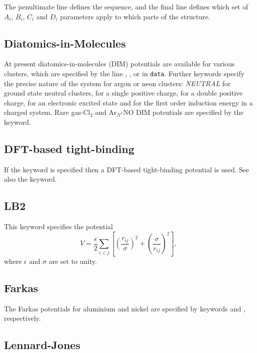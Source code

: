 {\noindent The penultimate line defines the sequence, and the final line
defines which set of $A_i$, $B_i$, $C_i$ and $D_i$ parameters apply to which 
parts of the structure.\cite{BrownFH03}


\subsection{Diatomics-in-Molecules}

At present diatomics-in-molecules (DIM) potentials are available for various
clusters, which are specified by the line {\/}, {\/},
{} or {\/} in {\tt data}.
Further keywords specify the precise nature of the system for argon or
neon clusters: {\it NEUTRAL\/} for ground state neutral
clusters, {\/} for a single positive charge, {\/} for a double positive
charge, {\/} for an electronic excited state and {\/} for the first order
induction energy in a charged system. Rare gas-Cl$_2$ and Ar$_N$-NO DIM potentials
are specified by the {\/} keyword.

\subsection{DFT-based tight-binding}

If the {\/} keyword is specified then a DFT-based tight-binding potential
is used. See also the {\/} keyword.

\subsection{LB2}

This keyword specifies the potential\cite{LB299a,LB299b,LB204}
\begin{equation}
V = \frac{\epsilon}{2} \sum_{i<j} \left[ \left(\frac{r_{ij}}{\sigma}\right)^2+
\left(\frac{\sigma}{r_{ij}}\right)^2\right],
\end{equation}
where $\epsilon$ and $\sigma$ are set to unity.

\subsection{Farkas}

The Farkas potentials for aluminium and nickel are specified by keywords {\/} and
{\/}, respectively.

\subsection{Lennard-Jones}

}

